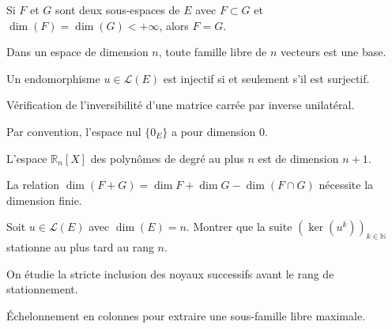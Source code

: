 \documentclass[11pt,a4paper]{report}
\begin{document}
\begin{property}
Si $F$ et $G$ sont deux sous-espaces de $E$ avec $F \subset G$ et $\dim(F) = \dim(G) < +\infty$, alors $F = G$.
\end{property}

\begin{consequence}
Dans un espace de dimension $n$, toute famille libre de $n$ vecteurs est une base.
\end{consequence}

\begin{corollary}[Isomorphismes]
Un endomorphisme $u \in \mathcal{L}(E)$ est injectif si et seulement s'il est surjectif.
\end{corollary}

\begin{application}
Vérification de l'inversibilité d'une matrice carrée par inverse unilatéral.
\end{application}

\begin{remark}
Par convention, l'espace nul $\{0_E\}$ a pour dimension 0.
\end{remark}

\begin{example}
L'espace $\mathbb{R}_n[X]$ des polynômes de degré au plus $n$ est de dimension $n+1$.
\end{example}

\begin{attention}
\label{attention:dim_inf}
La relation $\dim(F + G) = \dim F + \dim G - \dim(F \cap G)$ nécessite la dimension finie.
\end{attention}

\begin{exercise}
\label{exo:noyaux_iteres}
Soit $u \in \mathcal{L}(E)$ avec $\dim(E) = n$. Montrer que la suite $(\ker(u^k))_{k \in \mathbb{N}}$ stationne au plus tard au rang $n$.
\end{exercise}

\begin{correction}
On étudie la stricte inclusion des noyaux successifs avant le rang de stationnement.
\end{correction}

\begin{methodbox}
Échelonnement en colonnes pour extraire une sous-famille libre maximale.
\end{methodbox}
\end{document}
